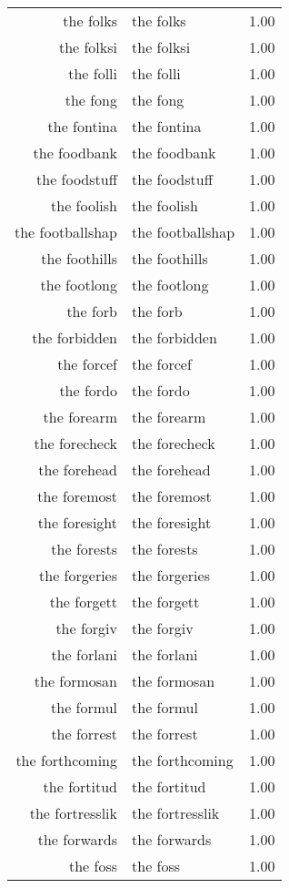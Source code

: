 \begin{table}[ht]
\begin{tabular}{rlr}
  the folks & the folks & 1.00 \\ 
  the folksi & the folksi & 1.00 \\ 
  the folli & the folli & 1.00 \\ 
  the fong & the fong & 1.00 \\ 
  the fontina & the fontina & 1.00 \\ 
  the foodbank & the foodbank & 1.00 \\ 
  the foodstuff & the foodstuff & 1.00 \\ 
  the foolish & the foolish & 1.00 \\ 
  the footballshap & the footballshap & 1.00 \\ 
  the foothills & the foothills & 1.00 \\ 
  the footlong & the footlong & 1.00 \\ 
  the forb & the forb & 1.00 \\ 
  the forbidden & the forbidden & 1.00 \\ 
  the forcef & the forcef & 1.00 \\ 
  the fordo & the fordo & 1.00 \\ 
  the forearm & the forearm & 1.00 \\ 
  the forecheck & the forecheck & 1.00 \\ 
  the forehead & the forehead & 1.00 \\ 
  the foremost & the foremost & 1.00 \\ 
  the foresight & the foresight & 1.00 \\ 
  the forests & the forests & 1.00 \\ 
  the forgeries & the forgeries & 1.00 \\ 
  the forgett & the forgett & 1.00 \\ 
  the forgiv & the forgiv & 1.00 \\ 
  the forlani & the forlani & 1.00 \\ 
  the formosan & the formosan & 1.00 \\ 
  the formul & the formul & 1.00 \\ 
  the forrest & the forrest & 1.00 \\ 
  the forthcoming & the forthcoming & 1.00 \\ 
  the fortitud & the fortitud & 1.00 \\ 
  the fortresslik & the fortresslik & 1.00 \\ 
  the forwards & the forwards & 1.00 \\ 
  the foss & the foss & 1.00 \\ 

\end{tabular}
\end{table}
